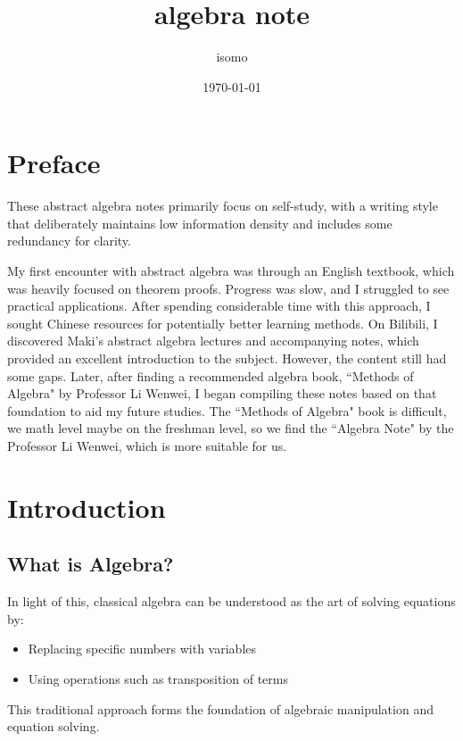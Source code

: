 \documentclass[11pt,lang=en]{elegantbook}
\title{algebra note}
\author{isomo}
\date{\today}
\begin{document}
\maketitle


\chapter*{Preface}

These abstract algebra notes primarily focus on self-study, with a writing style that deliberately maintains low information density and includes some redundancy for clarity.

My first encounter with abstract algebra was through an English textbook, which was heavily focused on theorem proofs. Progress was slow, and I struggled to see practical applications. After spending considerable time with this approach, I sought Chinese resources for potentially better learning methods. On Bilibili, I discovered Maki's abstract algebra lectures and accompanying notes, which provided an excellent introduction to the subject. However, the content still had some gaps. Later, after finding a recommended algebra book, ``Methods of Algebra" by Professor Li Wenwei, I began compiling these notes based on that foundation to aid my future studies. The ``Methods of Algebra" book is difficult, we math level maybe on the freshman level, so we find the ``Algebra Note" by the Professor Li Wenwei, which is more suitable for us.

\frontmatter
\tableofcontents

\mainmatter

\chapter{Introduction}

\section{What is Algebra?}

In light of this, classical algebra can be understood as the art of solving equations by:
\begin{itemize}
  \item Replacing specific numbers with variables
  \item Using operations such as transposition of terms
\end{itemize}

This traditional approach forms the foundation of algebraic manipulation and equation solving.
\end{document}
